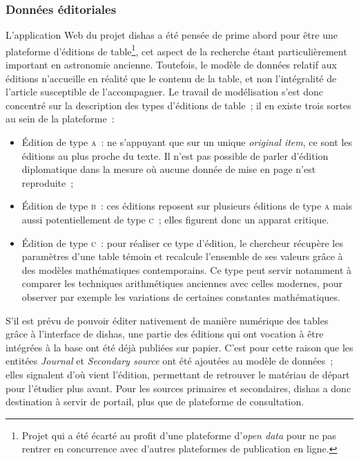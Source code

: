 \documentclass[a4paper,12pt,twoside]{book}
\newcommand{\eng}{\emph}
\newcommand{\oi}{\eng{original item}\xspace}
\newcommand{\dishas}{\gls{dishas}\xspace}
\begin{document}
			\subsubsection{Données éditoriales}
L'application Web du projet \dishas a été pensée de prime abord pour être une plateforme d'éditions de table\footnote{Projet qui a été écarté au profit d'une plateforme d'\eng{open data} pour ne pas rentrer en concurrence avec d'autres plateformes de publication en ligne.}, cet aspect de la recherche étant particulièrement important en astronomie ancienne. Toutefois, le modèle de données relatif aux éditions n'accueille en réalité que le contenu de la table, et non l'intégralité de l'article susceptible de l'accompagner. Le travail de modélisation s'est donc concentré sur la description des types d'éditions de table~; il en existe trois sortes au sein de la plateforme~:
\begin{itemize}
\item Édition de type \textsc{a}~: ne s'appuyant que sur un unique \oi, ce sont les éditions au plus proche du texte. Il n'est pas possible de parler d'édition diplomatique dans la mesure où aucune donnée de mise en page n'est reproduite~;
\item Édition de type \textsc{b}~: ces éditions reposent sur plusieurs éditions de type \textsc{a} mais aussi potentiellement de type \textsc{c}~; elles figurent donc un apparat critique.
\item Édition de type \textsc{c}~: pour réaliser ce type d'édition, le chercheur récupère les paramètres d'une table témoin et recalcule l'ensemble de ses valeurs grâce à des modèles mathématiques contemporains. Ce type peut servir notamment à comparer les techniques arithmétiques anciennes avec celles modernes, pour observer par exemple les variations de certaines constantes mathématiques.
\end{itemize}
S'il est prévu de pouvoir éditer nativement de manière numérique des tables grâce à l'interface de \dishas, une partie des éditions qui ont vocation à être intégrées à la base ont été déjà publiées sur papier. C'est pour cette raison que les entitées \eng{Journal} et \eng{Secondary source} ont été ajoutées au modèle de données~; elles signalent d'où vient l'édition, permettant de retrouver le matériau de départ pour l'étudier plus avant. Pour les sources primaires et secondaires, \dishas a donc destination à servir de portail, plus que de plateforme de consultation.
\end{document}
